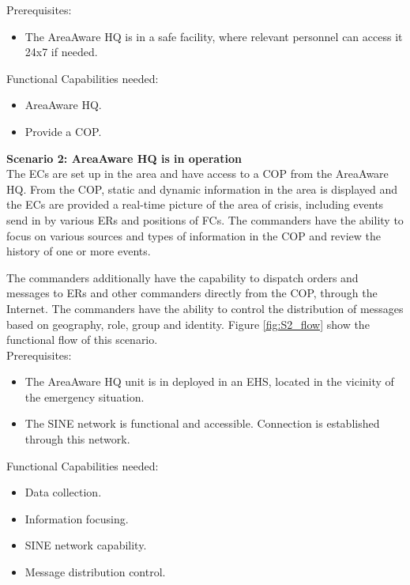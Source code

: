\noindent Prerequisites:
\begin{itemize}
	\item The AreaAware HQ is in a safe facility, where relevant personnel can access it 24x7 if needed.
\end{itemize}

\noindent Functional Capabilities needed:
\begin{itemize}
	\itemsep0em
	\item AreaAware HQ.
	\item Provide a COP.
\end{itemize}


\newpage
\noindent \textbf{Scenario 2: AreaAware HQ is in operation} \\
The ECs are set up in the area and have access to a COP from the AreaAware HQ.
From the COP, static and dynamic information in the area is displayed and the ECs are provided a real-time picture of the area of crisis, including events send in by various ERs and positions of FCs.
The commanders have the ability to focus on various sources and types of information in the COP and review the history of one or more events. 

The commanders additionally have the capability to dispatch orders and messages to ERs and other commanders directly from the COP, through the Internet. The commanders have the ability to control the distribution of messages based on geography, role, group and identity. Figure \ref{fig:S2_flow} show the functional flow of this scenario. \\

\noindent Prerequisites:
\begin{itemize}
	\itemsep0em
	\item The AreaAware HQ unit is in deployed in an EHS, located in the vicinity of the emergency situation.
	\item The SINE network is functional and accessible. Connection is established through this network.
\end{itemize}

\noindent Functional Capabilities needed:
\begin{itemize}
	\itemsep0em
	\item Data collection.
	\item Information focusing.
	\item SINE network capability.
	\item Message distribution control.
\end{itemize}

